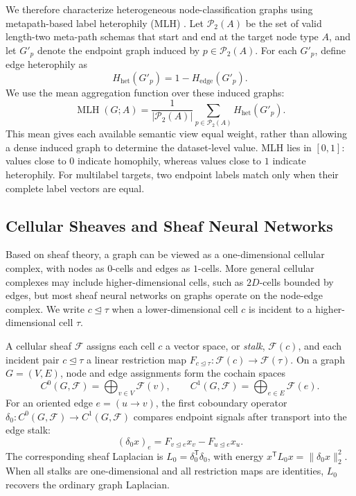 \documentclass[sigconf,anonymous,review]{acmart}
\newcommand{\cF}{\mathcal{F}}
\newcommand{\transpose}{\mathsf{T}}
\begin{document}
We therefore characterize heterogeneous node-classification graphs using metapath-based label
heterophily (MLH) \cite{lin2025heterophily}. Let $\mathcal{P}_2(A)$ be the set of valid
length-two meta-path schemas that start and end at the target node type $A$, and let $G'_p$ denote
the endpoint graph induced by $p\in\mathcal{P}_2(A)$. For each $G'_p$, define edge heterophily as
\begin{equation}
  H_{\mathrm{het}}(G'_p)=1-H_{\mathrm{edge}}(G'_p).
  \label{eq:background-edge-heterophily}
\end{equation}
We use the mean aggregation function over these induced graphs:
\begin{equation}
    \operatorname{MLH}(G;A)
    =
    \frac{1}{|\mathcal{P}_2(A)|}
    \sum_{p \in \mathcal{P}_2(A)}
    H_{\mathrm{het}}(G'_p).
    \label{eq:overall-mlh}
\end{equation}
This mean gives each available semantic view equal weight, rather than allowing a dense induced
graph to determine the dataset-level value. MLH lies in $[0,1]$: values close to $0$ indicate
homophily, whereas values close to $1$ indicate heterophily. For multilabel targets, two endpoint
labels match only when their complete label vectors are equal.

\subsection{Cellular Sheaves and Sheaf Neural Networks}

Based on sheaf theory, a graph can be viewed as a one-dimensional cellular complex, with nodes as \(0\)-cells and edges as
\(1\)-cells. More general cellular complexes may include higher-dimensional cells, such as
\(2D\)-cells bounded by edges, but most sheaf neural networks on graphs operate on the node-edge
complex. We write \(c\unlhd\tau\) when a lower-dimensional cell \(c\) is incident to a
higher-dimensional cell \(\tau\).

A cellular sheaf \(\cF\) assigns each cell \(c\) a vector space, or \emph{stalk},
\(\cF(c)\), and each incident pair \(c\unlhd\tau\) a linear restriction map
\(F_{c\unlhd\tau}:\cF(c)\rightarrow\cF(\tau)\). On a graph \(G=(V,E)\), node and edge
assignments form the cochain spaces
\begin{equation}
  C^0(G,\cF)=\bigoplus_{v\in V}\cF(v),
  \qquad
  C^1(G,\cF)=\bigoplus_{e\in E}\cF(e).
\end{equation}
For an oriented edge \(e=(u\rightarrow v)\), the first coboundary operator
\(\delta_0:C^0(G,\cF)\rightarrow C^1(G,\cF)\) compares endpoint signals after transport into the
edge stalk:
\begin{equation}
  (\delta_0x)_e
  =
  F_{v\unlhd e}x_v-F_{u\unlhd e}x_u.
  \label{eq:prelim-delta0}
\end{equation}
The corresponding sheaf Laplacian is
\(L_0=\delta_0^{\transpose}\delta_0\), with energy
\(x^{\transpose}L_0x=\lVert\delta_0x\rVert_2^2\). When all stalks are one-dimensional and all
restriction maps are identities, \(L_0\) recovers the ordinary graph Laplacian.
\end{document}
